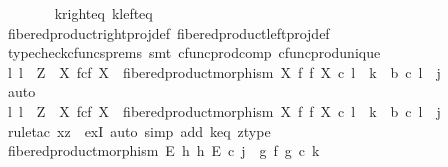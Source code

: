 \begin{isabellebody}
\ \ \ \ \ \ \isamarkupfalse%
\ k{\isacharunderscore}{\kern0pt}right{\isacharunderscore}{\kern0pt}eq\ k{\isacharunderscore}{\kern0pt}left{\isacharunderscore}{\kern0pt}eq\isanewline
\ \ \ \ \ \ \isamarkupfalse%
\ fibered{\isacharunderscore}{\kern0pt}product{\isacharunderscore}{\kern0pt}right{\isacharunderscore}{\kern0pt}proj{\isacharunderscore}{\kern0pt}def\ fibered{\isacharunderscore}{\kern0pt}product{\isacharunderscore}{\kern0pt}left{\isacharunderscore}{\kern0pt}proj{\isacharunderscore}{\kern0pt}def\isanewline
\ \ \ \ \ \ \isamarkupfalse%
\ {\isacharparenleft}{\kern0pt}typecheck{\isacharunderscore}{\kern0pt}cfuncs{\isacharunderscore}{\kern0pt}prems{\isacharcomma}{\kern0pt}\ smt\ cfunc{\isacharunderscore}{\kern0pt}prod{\isacharunderscore}{\kern0pt}comp\ cfunc{\isacharunderscore}{\kern0pt}prod{\isacharunderscore}{\kern0pt}unique{\isacharparenright}{\kern0pt}\isanewline
\isanewline
\ \ \ \ \isamarkupfalse%
\ {\isachardoublequoteopen}{\isasymexists}{\isacharbang}{\kern0pt}l{\isachardot}{\kern0pt}\ l\ {\isacharcolon}{\kern0pt}\ Z\ {\isasymrightarrow}\ X\ \isactrlbsub f\isactrlesub {\isasymtimes}\isactrlsub c\isactrlbsub f\isactrlesub \ X\ {\isasymand}\ fibered{\isacharunderscore}{\kern0pt}product{\isacharunderscore}{\kern0pt}morphism\ X\ f\ f\ X\ {\isasymcirc}\isactrlsub c\ l\ {\isacharequal}{\kern0pt}\ k\ {\isasymand}\ b\ {\isasymcirc}\isactrlsub c\ l\ {\isacharequal}{\kern0pt}\ j{\isachardoublequoteclose}\isanewline
\ \ \ \ \isamarkupfalse%
\ auto\isanewline
\ \ \ \ \ \ \isamarkupfalse%
\ {\isachardoublequoteopen}{\isasymexists}l{\isachardot}{\kern0pt}\ l\ {\isacharcolon}{\kern0pt}\ Z\ {\isasymrightarrow}\ X\ \isactrlbsub f\isactrlesub {\isasymtimes}\isactrlsub c\isactrlbsub f\isactrlesub \ X\ {\isasymand}\ fibered{\isacharunderscore}{\kern0pt}product{\isacharunderscore}{\kern0pt}morphism\ X\ f\ f\ X\ {\isasymcirc}\isactrlsub c\ l\ {\isacharequal}{\kern0pt}\ k\ {\isasymand}\ b\ {\isasymcirc}\isactrlsub c\ l\ {\isacharequal}{\kern0pt}\ j{\isachardoublequoteclose}\isanewline
\ \ \ \ \ \ \isamarkupfalse%
\ {\isacharparenleft}{\kern0pt}rule{\isacharunderscore}{\kern0pt}tac\ x{\isacharequal}{\kern0pt}z\ \ exI{\isacharcomma}{\kern0pt}\ auto\ simp\ add{\isacharcolon}{\kern0pt}\ k{\isacharunderscore}{\kern0pt}eq\ z{\isacharunderscore}{\kern0pt}type{\isacharparenright}{\kern0pt}\isanewline
\ \ \ \ \ \ \ \ \isamarkupfalse%
\ {\isachardoublequoteopen}fibered{\isacharunderscore}{\kern0pt}product{\isacharunderscore}{\kern0pt}morphism\ E\ h\ h\ E\ {\isasymcirc}\isactrlsub c\ j\ {\isacharequal}{\kern0pt}\ {\isacharparenleft}{\kern0pt}g\ {\isasymtimes}\isactrlsub f\ g{\isacharparenright}{\kern0pt}\ {\isasymcirc}\isactrlsub c\ k{\isachardoublequoteclose}\isanewline

\end{isabellebody}
